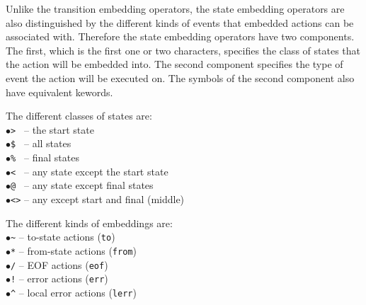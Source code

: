 \documentclass[letterpaper,11pt,oneside]{book}
\begin{document}
Unlike the transition embedding operators, the state embedding operators are
also distinguished by the different kinds of events that embedded actions can
be associated with. Therefore the state embedding operators have two
components.  The first, which is the first one or two characters, specifies the
class of states that the action will be embedded into. The second component
specifies the type of event the action will be executed on. The symbols of the
second component also have equivalent kewords. 

\def\fakeitem{\hspace*{12pt}$\bullet$\hspace*{10pt}}

\begin{minipage}{\textwidth}
\begin{multicols}{2}
\raggedcolumns
\noindent The different classes of states are:\\
\fakeitem \verb|> | -- the start state \\
\fakeitem \verb|$ | -- all states\\
\fakeitem \verb|% | -- final states\\
\fakeitem \verb|< | -- any state except the start state\\
\fakeitem \verb|@ | -- any state except final states\\
\fakeitem \verb|<>| -- any except start and final (middle)

\columnbreak

\noindent The different kinds of embeddings are:\\
\fakeitem \verb|~| -- to-state actions (\verb|to|)\\
\fakeitem \verb|*| -- from-state actions (\verb|from|)\\
\fakeitem \verb|/| -- EOF actions (\verb|eof|)\\
\fakeitem \verb|!| -- error actions (\verb|err|)\\
\fakeitem \verb|^| -- local error actions (\verb|lerr|)\\
\end{multicols}
\end{minipage}
%
\end{document}
